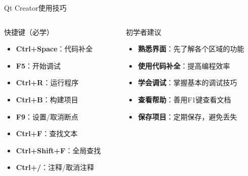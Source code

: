 \documentclass[UTF8,aspectratio=169]{beamer}
\begin{document}
\begin{frame}{Qt Creator使用技巧}
    \begin{columns}[onlytextwidth]
        \begin{column}{0.48\textwidth}
            \begin{ytublock}{快捷键（必学）}
                \begin{itemize}
                    \item \textbf{Ctrl+Space}：代码补全
                    \item \textbf{F5}：开始调试
                    \item \textbf{Ctrl+R}：运行程序
                    \item \textbf{Ctrl+B}：构建项目
                    \item \textbf{F9}：设置/取消断点
                    \item \textbf{Ctrl+F}：查找文本
                    \item \textbf{Ctrl+Shift+F}：全局查找
                    \item \textbf{Ctrl+/}：注释/取消注释
                \end{itemize}
            \end{ytublock}
        \end{column}
        \hspace{0.02\textwidth}
        \begin{column}{0.48\textwidth}
            \begin{ytublock}{初学者建议}
                \begin{itemize}
                    \item \textbf{熟悉界面}：先了解各个区域的功能
                    \item \textbf{使用代码补全}：提高编程效率
                    \item \textbf{学会调试}：掌握基本的调试技巧
                    \item \textbf{查看帮助}：善用F1键查看文档
                    \item \textbf{保存项目}：定期保存，避免丢失
                \end{itemize}
            \end{ytublock}
        \end{column}
    \end{columns}
\end{frame}
\end{document}
